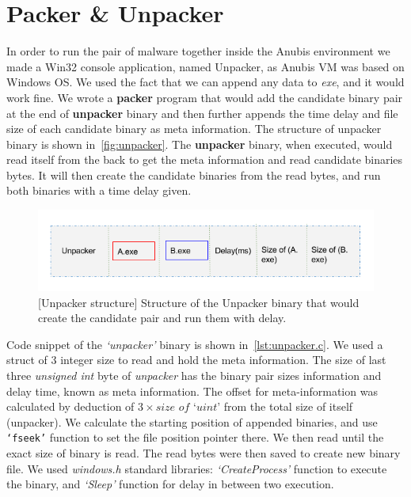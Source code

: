 \section{Packer \& Unpacker}
\label{sec:packerunpacker}
In order to run the pair of malware together inside the Anubis environment we made a Win32 console application, named Unpacker, as Anubis VM was based on Windows OS.\@
We used the fact that we can append any data to \emph{exe}, and it would work fine.
We wrote a \textbf{packer} program that would add the candidate binary pair at the end of \textbf{unpacker} binary and then further appends the time delay and file size of each candidate binary as meta information.
The structure of unpacker binary is shown in~\autoref{fig:unpacker}.
The \textbf{unpacker} binary, when executed, would read itself from the back to get the meta information and read candidate binaries bytes.
It will then create the candidate binaries from the read bytes, and run both binaries with a time delay given.\\
\begin{figure}[htbp]
  \centering
  \includegraphics[scale=0.5]{figures/unpacker.png}
\caption{[Unpacker structure] Structure of the Unpacker binary that would create the candidate pair and run them with delay.}
\label{fig:unpacker}
\end{figure}

Code snippet of the \emph{`unpacker'} binary is shown in~\autoref{lst:unpacker.c}.
We used a struct of 3 integer size to read and hold the meta information. The size of last three \textit{unsigned int} byte of \emph{unpacker} has the binary pair sizes information and delay time, known as meta information.
The offset for meta-information was calculated by deduction of $3 \times \textit{size of `uint'}$ from the total size of itself (unpacker).
We calculate the starting position of appended binaries, and use \texttt{`fseek\(\)'} function to set the file position pointer there.
We then read until the exact size of binary is read.
The read bytes were then saved to create new binary file.
We used \emph{windows.h} standard libraries: \emph{`CreateProcess'} function to execute the binary, and \emph{`Sleep'} function for delay in between two execution.\\

